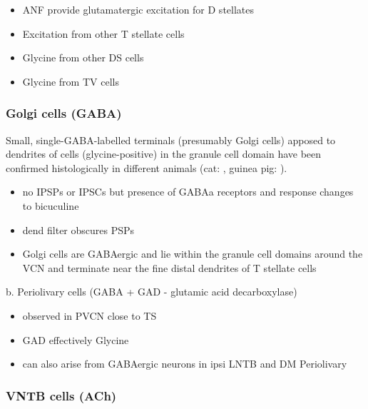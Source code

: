 \begin{itemize}
\item ANF provide glutamatergic excitation for D stellates  \citep{Cant:1981,FerragamoGoldingEtAl:1998a,Alibardi:1998a}
\item Excitation from other T stellate cells \citep{FerragamoGoldingEtAl:1998a}
\item Glycine from other DS cells \citep{FerragamoGoldingEtAl:1998a}
\item Glycine from TV cells \citep{WickesbergOertel:1990,ZhangOertel:1993b}
\end{itemize}

     
\subsubsection{Golgi cells (GABA)}

Small, single-GABA-labelled terminals (presumably Golgi cells) apposed to
dendrites of \DS cells (glycine-positive) in the granule cell domain have been
confirmed histologically in different animals (cat: \citealt{SmithRhode:1989},
guinea pig: \citealt{KolstonOsenEtAl:1992}).


\begin{itemize}
\item no IPSPs or IPSCs but presence of GABAa receptors and response changes to bicuculine \citep{WuOertel:1986,OertelWickesberg:1993,FerragamoGoldingEtAl:1998a}
\item dend filter obscures PSPs
\item Golgi cells are GABAergic and lie within the granule cell domains around the VCN and terminate near the fine distal dendrites of T stellate cells
\end{itemize}

b. Periolivary cells (GABA + GAD - glutamic acid decarboxylase) 

\begin{itemize}
\item observed in PVCN close to TS \citep{AdamsMugnaini:1987}
\item GAD effectively Glycine \citep{GoldingOertel:1997}
\item can also arise from GABAergic neurons in ipsi LNTB and DM Periolivary
\end{itemize}

\subsubsection{VNTB cells (ACh)}

